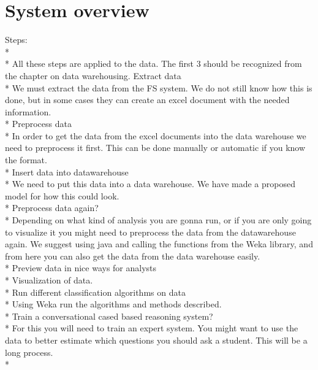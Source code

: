 \chapter{System overview}
Steps:\\*
\\*
All these steps are applied to the data. The first 3 should be recognized from the chapter on data warehousing. 
Extract data\\*
We must extract the data from the FS system. We do not still know how this is done, but in some cases they can create an excel document with the needed information.
\\*
Preprocess data\\*
In order to get the data from the excel documents into the data warehouse we need to preprocess it first. This can be done manually or automatic if you know the format.
\\*
Insert data into datawarehouse\\*
We need to put this data into a data warehouse. We have made a proposed model for how this could look.
\\*
Preprocess data again?\\*
Depending on what kind of analysis you are gonna run, or if you are only going to visualize it you might need to preprocess the data from the datawarehouse again.
We suggest using java and calling the functions from the Weka library, and from here you can also get the data from the data warehouse easily.
\\*
Preview data in nice ways for analysts\\*
Visualization of data.
\\*
Run different classification algorithms on data\\*
Using Weka run the algorithms and methods described.
\\*
Train a conversational cased based reasoning system?\\*
For this you will need to train an expert system.
You might want to use the data to better estimate which questions you should ask a student.
This will be a long process.
\\*




